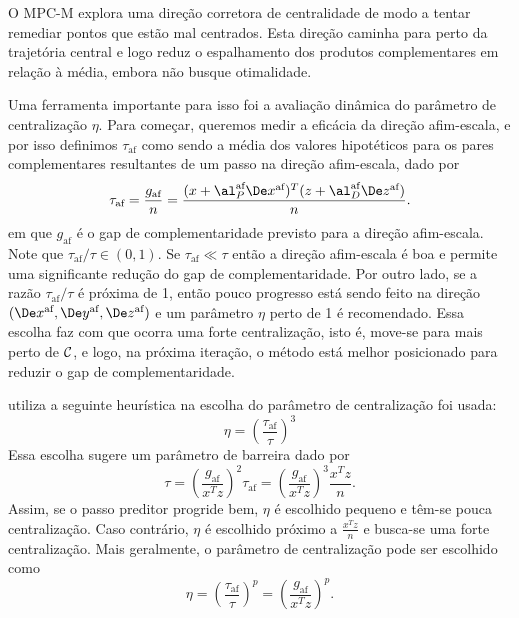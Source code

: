 O \ac{MPC-M} explora uma direção corretora de centralidade de modo a
tentar remediar pontos que estão mal centrados. Esta direção caminha para
perto da trajetória central e logo reduz o espalhamento dos produtos
complementares em relação à média, embora não busque otimalidade.

Uma ferramenta importante para isso foi a avaliação dinâmica do parâmetro de
centralização $\eta$. Para começar, queremos medir a eficácia da direção
afim-escala, e por isso definimos $\tau_{\text{af}}$ como sendo a média dos valores
hipotéticos para os pares complementares resultantes de um passo na direção
afim-escala, dado por 
\begin{equation}
\label{eq:tau-affine}
 \tau_{\text{af}} = \frac{g_{\text{af}}}{n} = \frac{(x+\al_P^{\text{af}}\dex)^T
(z+\al_D^{\text{af}}\dez)}{n}.
\end{equation}
em que $g_{\text{af}}$ é o gap de complementaridade previsto para a direção afim-escala.
Note que $\tau_{\text{af}}/\tau\in(0,1)$. Se $\tau_{\text{af}}\ll\tau$ então a direção afim-escala é
boa e permite uma significante redução do gap de complementaridade. Por outro
lado, se a razão $\tau_{\text{af}}/\tau$ é próxima de 1, então pouco progresso está sendo
feito na direção  $(\dex, \dey, \dez)$ e um parâmetro $\eta$ perto de 1 é
recomendado. Essa escolha faz com que ocorra uma forte centralização, isto é,
move-se para mais perto de $\mathcal{C}$, e logo, na próxima iteração, o método está
melhor posicionado para reduzir o gap de complementaridade.

 \textcite{Mehrotra:1992wr} utiliza a seguinte heurística na escolha do parâmetro
 de centralização foi usada:
\begin{equation}\label{eq:Mehrotra-centralizer-parameter}
\eta = \left(\frac{\tau_{\text{af}}}{\tau}\right)^3
\end{equation}
Essa escolha sugere um parâmetro de barreira dado por 
\begin{equation}\label{eq:Mehrotra-barrier-parameter}
\tau = \left(\frac{g_{\text{af}}}{x^Tz}\right)^2\tau_{\text{af}} =
\left(\frac{g_{\text{af}}}{x^Tz}\right)^3\frac{x^Tz}{n}.
\end{equation}
Assim, se o passo preditor progride bem, $\eta$ é escolhido pequeno e têm-se
pouca centralização. Caso contrário, $\eta$ é escolhido próximo a $\frac{x^Tz}{n}$ e busca-se
uma forte centralização. Mais geralmente, o parâmetro de
centralização pode ser escolhido como
\[
\eta = \left(\frac{\tau_{\text{af}}}{\tau}\right)^p = \left(\frac{g_{\text{af}}}{x^Tz}\right)^p.
\]

